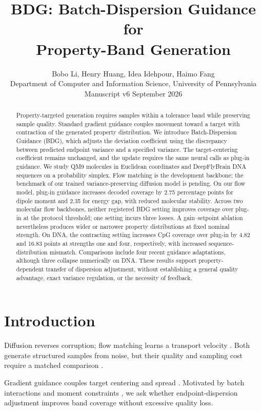 \documentclass{article}
\title{BDG: Batch-Dispersion Guidance for\\Property-Band Generation}
\author{Bobo Li, Henry Huang, Idea Idehpour, Haimo Fang\\
Department of Computer and Information Science, University of Pennsylvania\\
\small Manuscript v6 \quad 28 September 2026}
\begin{document}
\maketitle
\begin{abstract}
Property-targeted generation requires samples within a tolerance band while preserving sample quality. Standard gradient guidance couples movement toward a target with contraction of the generated property distribution. We introduce Batch-Dispersion Guidance (BDG), which adjusts the deviation coefficient using the discrepancy between predicted endpoint variance and a specified variance. The target-centering coefficient remains unchanged, and the update requires the same neural calls as plug-in guidance. We study QM9 molecules in Euclidean coordinates and DeepFlyBrain DNA sequences on a probability simplex. Flow matching is the development backbone; the benchmark of our trained variance-preserving diffusion model is pending. On our flow model, plug-in guidance increases decoded coverage by 2.75 percentage points for dipole moment and 2.35 for energy gap, with reduced molecular stability. Across two molecular flow backbones, neither registered BDG setting improves coverage over plug-in at the protocol threshold; one setting incurs three losses. A gain--setpoint ablation nevertheless produces wider or narrower property distributions at fixed nominal strength. On DNA, the contracting setting increases CpG coverage over plug-in by 4.82 and 16.83 points at strengths one and four, respectively, with increased sequence-distribution mismatch. Comparisons include four recent guidance adaptations, although three collapse numerically on DNA. These results support property-dependent transfer of dispersion adjustment, without establishing a general quality advantage, exact variance regulation, or the necessity of feedback.
\end{abstract}

\section{Introduction}
Diffusion reverses corruption; flow matching learns a transport velocity \citep{karras2022elucidating,lipman2022flow}. Both generate structured samples from noise, but their quality and sampling cost require a matched comparison \citep{albergo2025stochastic}.

Gradient guidance couples target centering and spread \citep{chung2023dps,song2023lgd}. Motivated by batch interactions and moment constraints \citep{corso2024particle,mgd2026moment}, we ask whether endpoint-dispersion adjustment improves band coverage without excessive quality loss.
\end{document}
